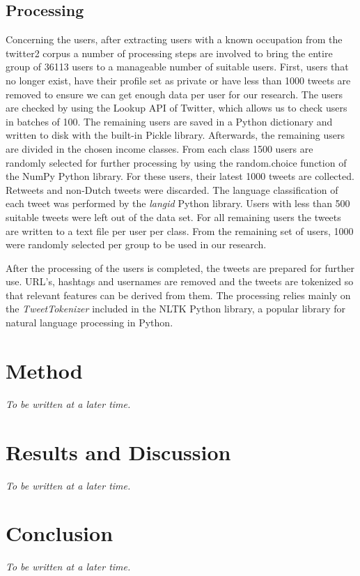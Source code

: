 \documentclass[
10pt, %
a4paper, %
oneside, %
headinclude,footinclude, %
] {book}%
\begin{document}
\section{Processing}

Concerning the users, after extracting users with a known occupation from the twitter2 corpus a number of processing steps are involved to bring the entire group of 36113 users to a manageable number of suitable users. First, users that no longer exist, have their profile set as private or have less than 1000 tweets are removed to ensure we can get enough data per user for our research. The users are checked by using the Lookup API of Twitter, which allows us to check users in batches of 100. The remaining users are saved in a Python dictionary and written to disk with the built-in Pickle library. Afterwards, the remaining users are divided in the chosen income classes. From each class 1500 users are randomly selected for further processing by using the random.choice function of the NumPy Python library. For these users, their latest 1000 tweets are collected. Retweets and non-Dutch tweets were discarded. The language classification of each tweet was performed by the \textit{langid} Python library. Users with less than 500 suitable tweets were left out of the data set. For all remaining users the tweets are written to a text file per user per class. From the remaining set of users, 1000 were randomly selected per group to be used in our research.

After the processing of the users is completed, the tweets are prepared for further use. URL's, hashtags and usernames are removed and the tweets are tokenized so that relevant features can be derived from them. The processing relies mainly on the \textit{TweetTokenizer} included in the NLTK Python library, a popular library for natural language processing in Python.

\chapter{Method}

\textit{To be written at a later time.}


\chapter{Results and Discussion}

\textit{To be written at a later time.}


\chapter{Conclusion}

\textit{To be written at a later time.}



 

\end{document}
